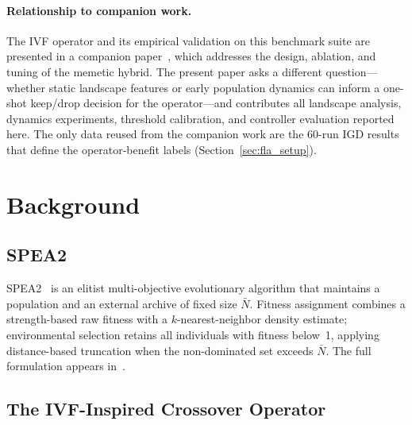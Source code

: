 \documentclass[runningheads]{llncs}
\begin{document}
\paragraph{Relationship to companion work.}
The IVF operator and its empirical validation on this benchmark suite are
presented in a companion paper~\cite{zambrano2026ivfspea2}, which addresses
the design, ablation, and tuning of the memetic hybrid. The present paper
asks a different question---whether static landscape features or early
population dynamics can inform a one-shot keep/drop decision for the
operator---and contributes all landscape analysis, dynamics experiments,
threshold calibration, and controller evaluation reported here. The only
data reused from the companion work are the 60-run IGD results that define
the operator-benefit labels (Section~\ref{sec:fla_setup}).

\section{Background}
\label{sec:background}

\subsection{SPEA2}
\label{sec:spea2}

SPEA2~\cite{zitzler2001spea2} is an elitist multi-objective evolutionary
algorithm that maintains a population and an external archive of fixed size
$\bar{N}$. Fitness assignment combines a strength-based raw fitness with a
$k$-nearest-neighbor density estimate; environmental selection retains all
individuals with fitness below~1, applying distance-based truncation when the
non-dominated set exceeds $\bar{N}$. The full formulation appears
in~\cite{zitzler2001spea2}.

\subsection{The IVF-Inspired Crossover Operator}
\label{sec:ivf}
\end{document}
